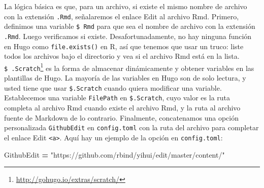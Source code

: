 \documentclass[12pt,]{krantz}
\makeatletter
\newenvironment{Shaded}{\begin{snugshade}}{\end{snugshade}}
\newcommand{\KeywordTok}[1]{\textcolor[rgb]{0.13,0.29,0.53}{\textbf{#1}}}
\newcommand{\NormalTok}[1]{#1}
\newcommand{\OperatorTok}[1]{\textcolor[rgb]{0.81,0.36,0.00}{\textbf{#1}}}
\newcommand{\OtherTok}[1]{\textcolor[rgb]{0.56,0.35,0.01}{#1}}
\newcommand{\StringTok}[1]{\textcolor[rgb]{0.31,0.60,0.02}{#1}}
\renewcommand{\href}[2]{#2\footnote{\url{#1}}}
\newenvironment{kframe}{%
\medskip{}
\setlength{\fboxsep}{.8em}
 \def\at@end@of@kframe{}%
 \ifinner\ifhmode%
  \def\at@end@of@kframe{\end{minipage}}%
  \begin{minipage}{\columnwidth}%
 \fi\fi%
 \def\FrameCommand##1{\hskip\@totalleftmargin \hskip-\fboxsep
 \colorbox{shadecolor}{##1}\hskip-\fboxsep
     \hskip-\linewidth \hskip-\@totalleftmargin \hskip\columnwidth}%
 \MakeFramed {\advance\hsize-\width
   \@totalleftmargin\z@ \linewidth\hsize
   \@setminipage}}%
 {\par\unskip\endMakeFramed%
 \at@end@of@kframe}
\renewenvironment{Shaded}{\begin{kframe}}{\end{kframe}}
\theoremstyle{definition}
\theoremstyle{definition}
\theoremstyle{definition}
\theoremstyle{remark}
\makeatother
\begin{document}
\begin{itemize}
\begin{Shaded}
\end{Shaded}

  La lógica básica es que, para un archivo, si existe el mismo nombre de
  archivo con la extensión \texttt{.Rmd}, señalaremos el enlace Edit al
  archivo Rmd. Primero, definimos una variable \texttt{\$\ Rmd} para que
  sea el nombre de archivo con la extensión \texttt{.Rmd}. Luego
  verificamos si existe. Desafortunadamente, no hay ninguna función en
  Hugo como \texttt{file.exists()} en R, así que tenemos que usar un
  truco: liste todos los archivos bajo el directorio y vea si el archivo
  Rmd está en la lista.
  \href{http://gohugo.io/extras/scratch/}{\texttt{\$\ .Scratch}} es la
  forma de almacenar dinámicamente y obtener variables en las plantillas
  de Hugo. La mayoría de las variables en Hugo son de solo lectura, y
  usted tiene que usar \texttt{\$.Scratch} cuando quiera modificar una
  variable. Establecemos una variable \texttt{FilePath} en
  \texttt{\$.Scratch}, cuyo valor es la ruta completa al archivo Rmd
  cuando existe el archivo Rmd, y la ruta al archivo fuente de Markdown
  de lo contrario. Finalmente, concatenamos una opción personalizada
  \texttt{GithubEdit} en \texttt{config.toml} con la ruta del archivo
  para completar el enlace Edit \texttt{\textless{}a\textgreater{}}.
  Aquí hay un ejemplo de la opción en \texttt{config.toml}:

\begin{Shaded}
\begin{Highlighting}[]
\NormalTok{[params]}
\NormalTok{  GithubEdit }\OperatorTok{=} \StringTok{"https://github.com/rbind/yihui/edit/master/content/"}
\end{Highlighting}
\end{Shaded}


\end{itemize}
\end{document}
